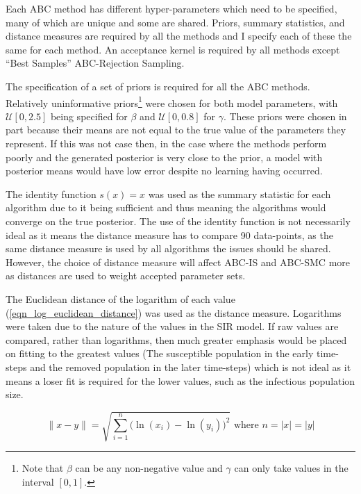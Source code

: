 \documentclass[11pt,a4paper]{article}
\theoremstyle{break}
\begin{document}
  \par Each ABC method has different hyper-parameters which need to be specified, many of which are unique and some are shared. Priors, summary statistics, and distance measures are required by all the methods and I specify each of these the same for each method. An acceptance kernel is required by all methods except ``Best Samples'' ABC-Rejection Sampling.

  \par The specification of a set of priors is required for all the ABC methods. Relatively uninformative priors\footnote{Note that $\beta$ can be any non-negative value and $\gamma$ can only take values in the interval $[0,1]$.} were chosen for both model parameters, with $\mathcal{U}[0,2.5]$ being specified for $\beta$ and $\mathcal{U}[0,0.8]$ for $\gamma$. These priors were chosen in part because their means are not equal to the true value of the parameters they represent. If this was not case then, in the case where the methods perform poorly and the generated posterior is very close to the prior, a model with posterior means would have low error despite no learning having occurred.

  \par The identity function $s(x)=x$ was used as the summary statistic for each algorithm due to it being sufficient and thus meaning the algorithms would converge on the true posterior. The use of the identity function is not necessarily ideal as it means the distance measure has to compare 90 data-points, as the same distance measure is used by all algorithms the issues should be shared. However, the choice of distance measure will affect ABC-IS and ABC-SMC more as distances are used to weight accepted parameter sets.

  \par The Euclidean distance of the logarithm of each value (\ref{eqn_log_euclidean_distance}) was used as the distance measure. Logarithms were taken due to the nature of the values in the SIR model. If raw values are compared, rather than logarithms, then much greater emphasis would be placed on fitting to the greatest values (The susceptible population in the early time-steps and the removed population in the later time-steps) which is not ideal as it means a loser fit is required for the lower values, such as the infectious population size.

  \begin{equation}\label{eqn_log_euclidean_distance}
    \|x-y\|=\sqrt{\sum_{i=1}^n\big(\ln(x_i)-\ln(y_i)\big)^2}\text{ where }n=|x|=|y|
  \end{equation}
\end{document}

